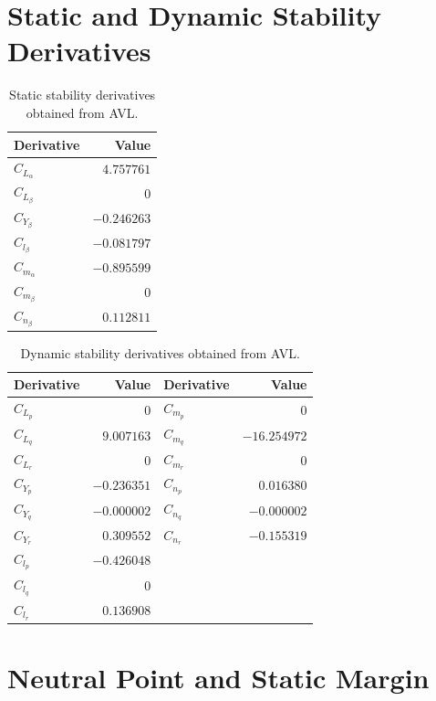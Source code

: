 \documentclass[11pt,a4paper]{article}
\begin{document}
\section{Static and Dynamic Stability Derivatives}

\begin{table}[H]
\centering
\caption{Static stability derivatives obtained from AVL.}
\label{tab:static_derivatives}
\begin{tabular}{lr}
\toprule
Derivative & Value \\
\midrule
$C_{L_\alpha}$ & $4.757761$ \\
$C_{L_\beta}$ & $0$ \\
$C_{Y_\beta}$ & $-0.246263$ \\
$C_{l_\beta}$ & $-0.081797$ \\
$C_{m_\alpha}$ & $-0.895599$ \\
$C_{m_\beta}$ & $0$ \\
$C_{n_\beta}$ & $0.112811$ \\
\bottomrule
\end{tabular}
\end{table}

\begin{table}[H]
\centering
\caption{Dynamic stability derivatives obtained from AVL.}
\label{tab:dynamic_derivatives}
\begin{tabular}{lr|lr}
\toprule
Derivative & Value & Derivative & Value \\
\midrule
$C_{L_p}$ & $0$ & $C_{m_p}$ & $0$ \\
$C_{L_q}$ & $9.007163$ & $C_{m_q}$ & $-16.254972$ \\
$C_{L_r}$ & $0$ & $C_{m_r}$ & $0$ \\
$C_{Y_p}$ & $-0.236351$ & $C_{n_p}$ & $0.016380$ \\
$C_{Y_q}$ & $-0.000002$ & $C_{n_q}$ & $-0.000002$ \\
$C_{Y_r}$ & $0.309552$ & $C_{n_r}$ & $-0.155319$ \\
$C_{l_p}$ & $-0.426048$ & & \\
$C_{l_q}$ & $0$ & & \\
$C_{l_r}$ & $0.136908$ & & \\
\bottomrule
\end{tabular}
\end{table}

\section{Neutral Point and Static Margin}
\end{document}
